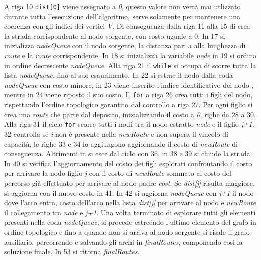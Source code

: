 \documentclass[]{article}
\begin{document}
A riga 10 \texttt{dist[0]} viene assegnato a  \emph{0}, questo valore non verrà mai utlizzato durante tutta l'esecuzione dell'algoritmo, serve solamente per mantenere una coerenza con gli indici dei vertici \emph{V}. Di conseguenza dalla riga 11 alla 15 di crea la strada corrispondente al nodo sorgente, con costo uguale a 0. In 17 si inizializza \textit{nodeQueue} con il nodo sorgente, la distanza pari a alla lunghezza di  \emph{route}  e la \emph{route} corrispondente.
In 18 si inizializza la variabile \textit{node} in 19 si ordina in ordine decrescente \textit{nodeQueue}. Alla riga 21 il \texttt{while} si occupa di scorre tutta la lista \textit{nodeQueue}, fino al suo esaurimento. In 22 si estrae il nodo dalla coda \textit{nodeQueue} con costo minore, in 23 viene inserito l'indice identificativo del nodo , mentre in 24 viene riposto il suo costo. Il \texttt{for} a riga 26 crea tutti i figli del nodo, rispettando l'ordine topologico garantito dal controllo a riga 27. Per ogni figlio si crea una \emph{route} che parte dal deposito, inizializzando il costo a \emph{0}, righe da 28 a 30. Alla riga 31 il ciclo \texttt{for} scorre tutti i nodi tra il nodo estratto  \textit{node} e il figlio \emph{j+1}, 32 controlla se \emph{i} non è presente nella \textit{newRoute} e non supera il vincolo di capacità, le righe 33 e 34 lo aggiungono aggiornando il costo di \textit{newRoute} di conseguenza.
Altrimenti in si esce dal ciclo con 36, in 38 e 39 si chiude la strada. In 40 si verifica l'aggiornamento del costo dei figli esplorati confrontando il costo per arrivare la nodo figlio \textit{j} con il costo di \textit{newRoute} sommato al costo del percorso già effettuato per arrivare al nodo padre \textit{cost}. Se \textit{dist[j]} risulta maggiore, si aggiorna con il nuovo costo in 41. In 42 si aggiorna \textit{nodeQueue} con \textit{j+1} il nodo dove l'arco entra, costo dell'arco nella lista \textit{dist[j]} per arrivare al nodo  e \textit{newRoute} il collegamento tra \textit{node} e \textit{j+1}. Una volta terminato di esplorare tutti gli elementi presenti nella coda \textit{nodeQueue}, si procede estreendo l'ultimo elemento del grafo in ordine topologico e fino a quando non si arriva al nodo sorgente si risale il grafo ausiliario, percorrendo e salvando gli archi in \textit{finalRoutes}, componendo così la soluzione finale. In 53 si ritorna \textit{finalRoutes}.
\end{document}
